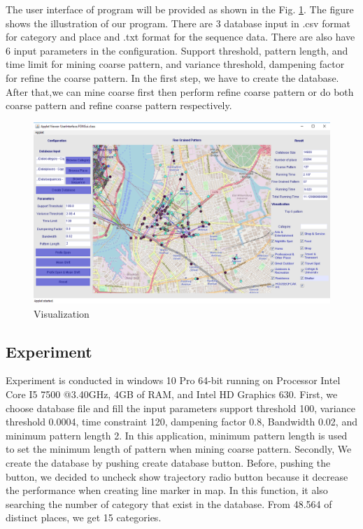 \documentclass[conference]{IEEEtran}
\begin{document}
The user interface of program will be provided as shown in the Fig. \ref{fig:visual}. The figure shows the illustration of our program. There are 3 database input in .csv format for category and place and .txt format for the sequence data. There are also have 6 input parameters in the configuration. Support threshold, pattern length, and time limit for mining coarse pattern, and variance threshold, dampening factor for refine the coarse pattern. In the first step, we have to create the database. After that,we can mine coarse first then perform refine coarse pattern or do both coarse pattern and refine coarse pattern respectively.
\begin{figure}[!h]
	\centering
	\includegraphics[width=1\linewidth]{visual}
	\caption{Visualization}
	\label{fig:visual}
\end{figure}

\subsection{Experiment}
Experiment is conducted in windows 10 Pro 64-bit running on Processor Intel Core I5 7500 @3.40GHz, 4GB of RAM, and Intel HD Graphics 630. First, we choose database file and fill the input parameters support threshold 100, variance threshold 0.0004, time constraint 120, dampening factor 0.8, Bandwidth 0.02, and minimum pattern length 2. In this application, minimum pattern length is used to set the minimum length of pattern when mining coarse pattern. Secondly, We create the database by pushing create database button. Before, pushing the button, we decided to uncheck show trajectory radio button because it decrease the performance when creating line marker in map. In this function, it also searching the number of category that exist in the database. From 48.564 of distinct places, we get 15 categories.   
\end{document}
